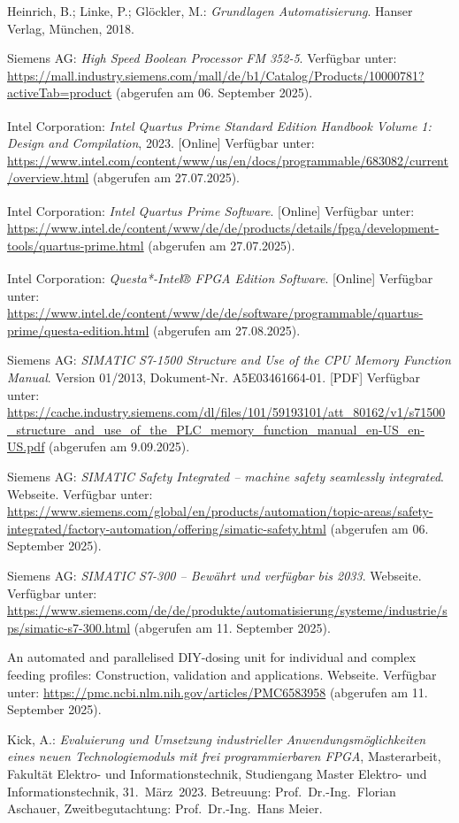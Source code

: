 \begin{thebibliography}{}
Heinrich, B.; Linke, P.; Glöckler, M.: \textit{Grundlagen Automatisierung}. 
Hanser Verlag, München, 2018.

Siemens AG: \textit{High Speed Boolean Processor FM 352-5}. Verfügbar unter: \url{https://mall.industry.siemens.com/mall/de/b1/Catalog/Products/10000781?activeTab=product} (abgerufen am 06. September 2025).

Intel\textsuperscript{\textregistered} Corporation: \textit{Intel Quartus Prime Standard Edition Handbook Volume 1: Design and Compilation}, 2023. [Online]  
Verfügbar unter: \url{https://www.intel.com/content/www/us/en/docs/programmable/683082/current/overview.html}  
(abgerufen am 27.07.2025).

Intel\textsuperscript{\textregistered} Corporation: \textit{Intel Quartus Prime Software}. [Online]  
Verfügbar unter: \url{https://www.intel.de/content/www/de/de/products/details/fpga/development-tools/quartus-prime.html}  
(abgerufen am 27.07.2025).

Intel\textsuperscript{\textregistered} Corporation: \textit{Questa*-Intel® FPGA Edition Software}. [Online]  
Verfügbar unter: \url{https://www.intel.de/content/www/de/de/software/programmable/quartus-prime/questa-edition.html}  
(abgerufen am 27.08.2025).

Siemens AG: \textit{SIMATIC S7-1500 Structure and Use of the CPU Memory Function Manual}. Version 01/2013, Dokument-Nr. A5E03461664-01. [PDF]  
Verfügbar unter: \url{https://cache.industry.siemens.com/dl/files/101/59193101/att_80162/v1/s71500_structure_and_use_of_the_PLC_memory_function_manual_en-US_en-US.pdf} (abgerufen am 9.09.2025).

Siemens AG: \textit{SIMATIC Safety Integrated – machine safety seamlessly integrated}. Webseite. Verfügbar unter: \url{https://www.siemens.com/global/en/products/automation/topic-areas/safety-integrated/factory-automation/offering/simatic-safety.html} (abgerufen am 06. September 2025).

Siemens AG: \textit{SIMATIC S7-300 – Bewährt und verfügbar bis 2033}. Webseite. Verfügbar unter: \url{https://www.siemens.com/de/de/produkte/automatisierung/systeme/industrie/sps/simatic-s7-300.html} (abgerufen am 11. September 2025).  

An automated and parallelised DIY-dosing unit for individual and complex feeding profiles: Construction, validation and applications. Webseite. Verfügbar unter: \url{https://pmc.ncbi.nlm.nih.gov/articles/PMC6583958} (abgerufen am 11. September 2025).  

Kick, A.: \textit{Evaluierung und Umsetzung industrieller Anwendungsmöglichkeiten eines neuen Technologiemoduls mit frei programmierbaren FPGA}, 
Masterarbeit, Fakultät Elektro- und Informationstechnik, Studiengang Master Elektro- und Informationstechnik, 31.\ März\ 2023. 
Betreuung: Prof.\ Dr.-Ing.\ Florian Aschauer, Zweitbegutachtung: Prof.\ Dr.-Ing.\ Hans Meier.

\end{thebibliography}
